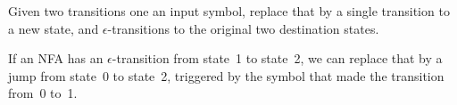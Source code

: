 Given two transitions one an input symbol, replace that by a single
transition to a new state, and $\epsilon$-transitions to the original
two destination states.

If an NFA has an $\epsilon$-transition from state~1 to state~2, we can
replace that by a jump from state~0 to state~2, triggered by the
symbol that made the transition from~0 to~1.
